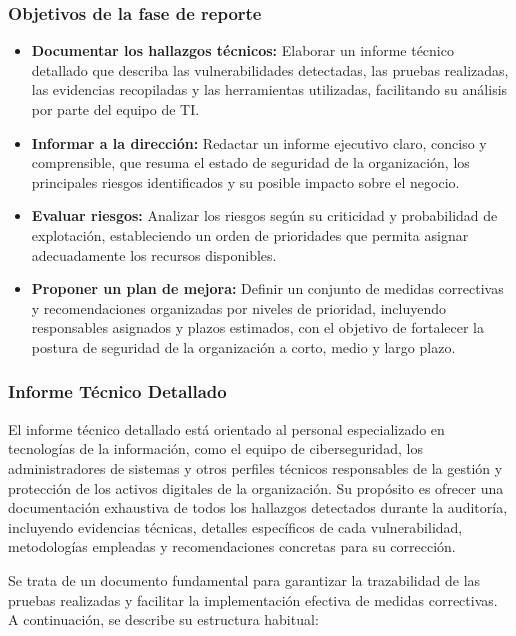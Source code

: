 \documentclass[a4paper, 11pt]{article}
\begin{document}
\subsubsection*{Objetivos de la fase de reporte}
\begin{itemize}
\item \textbf{Documentar los hallazgos técnicos:} Elaborar un informe técnico detallado que describa las vulnerabilidades detectadas, las pruebas realizadas, las evidencias recopiladas y las herramientas utilizadas, facilitando su análisis por parte del equipo de TI.

\item \textbf{Informar a la dirección:} Redactar un informe ejecutivo claro, conciso y comprensible, que resuma el estado de seguridad de la organización, los principales riesgos identificados y su posible impacto sobre el negocio.

\item \textbf{Evaluar riesgos:} Analizar los riesgos según su criticidad y probabilidad de explotación, estableciendo un orden de prioridades que permita asignar adecuadamente los recursos disponibles.

\item \textbf{Proponer un plan de mejora:} Definir un conjunto de medidas correctivas y recomendaciones organizadas por niveles de prioridad, incluyendo responsables asignados y plazos estimados, con el objetivo de fortalecer la postura de seguridad de la organización a corto, medio y largo plazo.
\end{itemize}




\subsubsection{Informe Técnico Detallado}

El informe técnico detallado está orientado al personal especializado en tecnologías de la información, como el equipo de ciberseguridad, los administradores de sistemas y otros perfiles técnicos responsables de la gestión y protección de los activos digitales de la organización. Su propósito es ofrecer una documentación exhaustiva de todos los hallazgos detectados durante la auditoría, incluyendo evidencias técnicas, detalles específicos de cada vulnerabilidad, metodologías empleadas y recomendaciones concretas para su corrección. 


Se trata de un documento fundamental para garantizar la trazabilidad de las pruebas realizadas y facilitar la implementación efectiva de medidas correctivas. A continuación, se describe su estructura habitual:
\end{document}
